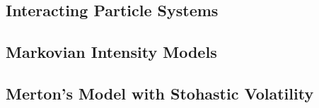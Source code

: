 \subsection{Interacting Particle Systems}

\subsection{Markovian Intensity Models}
\subsection{Merton's Model with Stohastic Volatility}

